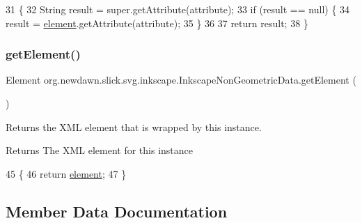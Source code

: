 \begin{DoxyCode}
31                                                  \{
32         String result = super.getAttribute(attribute);
33         \textcolor{keywordflow}{if} (result == null) \{
34             result = \mbox{\hyperlink{classorg_1_1newdawn_1_1slick_1_1svg_1_1inkscape_1_1_inkscape_non_geometric_data_a5a9eaa3f1e55ba4c4c37037e1cbd94c1}{element}}.getAttribute(attribute);
35         \}
36         
37         \textcolor{keywordflow}{return} result;
38     \}
\end{DoxyCode}
\mbox{\label{classorg_1_1newdawn_1_1slick_1_1svg_1_1inkscape_1_1_inkscape_non_geometric_data_a150cb86f501b03af492ca41dfd92952f}} 
\subsubsection{\texorpdfstring{get\+Element()}{getElement()}}
{\footnotesize\ttfamily Element org.\+newdawn.\+slick.\+svg.\+inkscape.\+Inkscape\+Non\+Geometric\+Data.\+get\+Element (\begin{DoxyParamCaption}{ }\end{DoxyParamCaption})\hspace{0.3cm}{\ttfamily [inline]}}

Returns the X\+ML element that is wrapped by this instance.

\begin{DoxyReturn}{Returns}
The X\+ML element for this instance 
\end{DoxyReturn}

\begin{DoxyCode}
45                                 \{
46         \textcolor{keywordflow}{return} \mbox{\hyperlink{classorg_1_1newdawn_1_1slick_1_1svg_1_1inkscape_1_1_inkscape_non_geometric_data_a5a9eaa3f1e55ba4c4c37037e1cbd94c1}{element}};
47     \} 
\end{DoxyCode}


\subsection{Member Data Documentation}
\mbox{\label{classorg_1_1newdawn_1_1slick_1_1svg_1_1inkscape_1_1_inkscape_non_geometric_data_a5a9eaa3f1e55ba4c4c37037e1cbd94c1}} 
